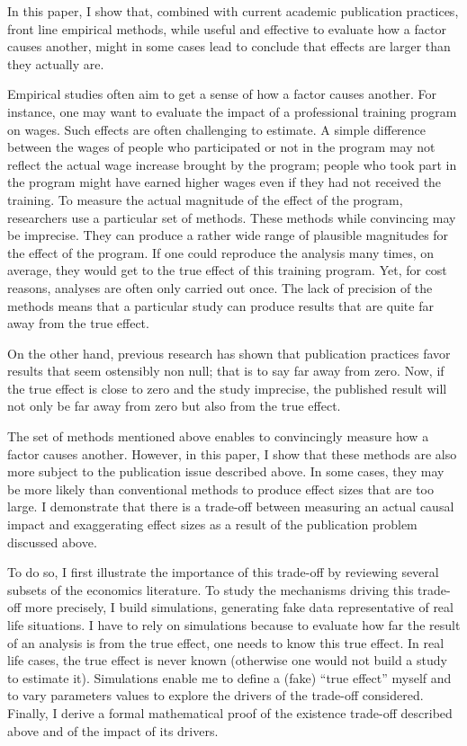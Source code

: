In this paper, I show that, combined with current academic publication practices, front line empirical methods, while useful and effective to evaluate how a factor causes another, might in some cases lead to conclude that effects are larger than they actually are.\newline

Empirical studies often aim to get a sense of how a factor causes another. For instance, one may want to evaluate the impact of a professional training program on wages. Such effects are often challenging to estimate. A simple difference between the wages of people who participated or not in the program may not reflect the actual wage increase brought by the program; people who took part in the program might have earned higher wages even if they had not received the training. To measure the actual magnitude of the effect of the program, researchers use a particular set of methods. These methods while convincing may be imprecise. They can produce a rather wide range of plausible magnitudes for the effect of the program. If one could reproduce the analysis many times, on average, they would get to the true effect of this training program. Yet, for cost reasons, analyses are often only carried out once. The lack of precision of the methods means that a particular study can produce results that are quite far away from the true effect.

On the other hand, previous research has shown that publication practices favor results that seem ostensibly non null; that is to say far away from zero. Now, if the true effect is close to zero and the study imprecise, the published result will not only be far away from zero but also from the true effect. 

The set of methods mentioned above enables to convincingly measure how a factor causes another. However, in this paper, I show that these methods are also more subject to the publication issue described above. In some cases, they may be more likely than conventional methods to produce effect sizes that are too large. I demonstrate that there is a trade-off between measuring an actual causal impact and exaggerating effect sizes as a result of the publication problem discussed above.

To do so, I first illustrate the importance of this trade-off by reviewing several subsets of the economics literature. To study the mechanisms driving this trade-off more precisely, I build simulations, generating fake data representative of real life situations. I have to rely on simulations because to evaluate how far the result of an analysis is from the true effect, one needs to know this true effect. In real life cases, the true effect is never known (otherwise one would not build a study to estimate it). Simulations enable me to define a (fake) ``true effect'' myself and to vary parameters values to explore the drivers of the trade-off considered. Finally, I derive a formal mathematical proof of the existence trade-off described above and of the impact of its drivers. 

